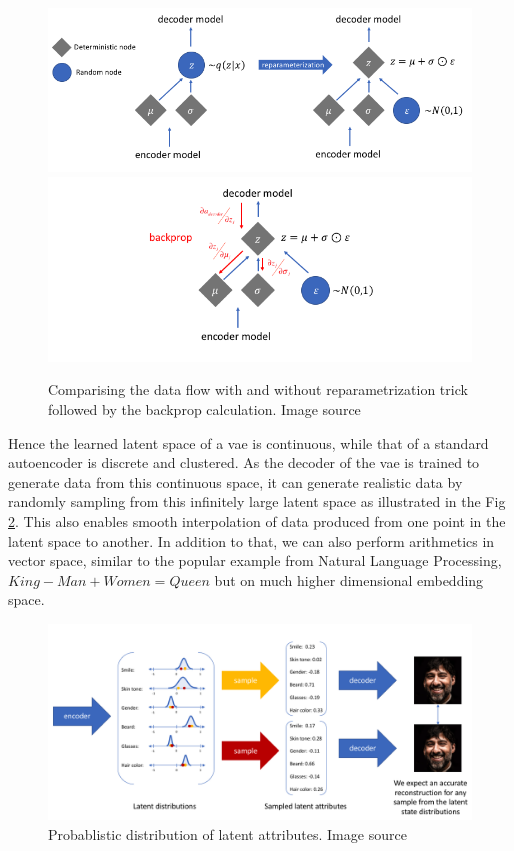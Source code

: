 \begin{figure}[!h]
    \centering
    \includegraphics[scale=0.5]{figures/background/reparametrization_trick.png}
    \includegraphics[scale=0.5]{figures/background/reparametrization_trick_backprop.png}
    \caption{Comparising the data flow with and without reparametrization trick followed by the backprop calculation. Image source \cite{jeremy_jordan_2018}}
    \label{fig:reparametrization_trick}
\end{figure}

Hence the learned latent space of a \ac{vae} is continuous, while that of a standard autoencoder is discrete and clustered. As the decoder of the \ac{vae} is trained to generate data from this continuous space, it can generate realistic data by randomly sampling from this infinitely large latent space as illustrated in the Fig \ref{fig:vae_latent_attribute}. This also enables smooth interpolation of data produced from one point in the latent space to another. In addition to that, we can also perform arithmetics in vector space, similar to the popular example from Natural Language Processing, $King - Man + Women = Queen$ but on much higher dimensional embedding space.

\begin{figure}[!h]
    \centering
    \includegraphics[scale=0.4]{figures/background/vae_latent_attribute.png}
    \caption{Probablistic distribution of latent attributes. Image source \cite{jeremy_jordan_2018}}
    \label{fig:vae_latent_attribute}
\end{figure}


